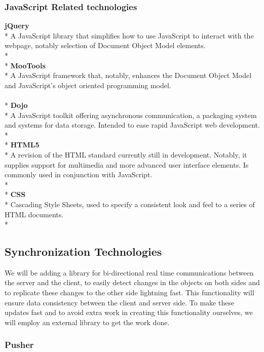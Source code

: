 \subsubsection{JavaScript Related technologies}

\textbf{jQuery}\\*
A JavaScript library that simplifies how to use JavaScript to interact with the webpage, notably selection of Document Object Model elements.\\*
\\*
\textbf{MooTools}\\*
A JavaScript framework that, notably, enhances the Document Object Model and JavaScript's object oriented programming model.\\
\\*
\textbf{Dojo}\\*
A JavaScript toolkit offering asynchronous communication, a packaging system and systems for data storage. Intended to ease rapid JavaScript web development.\\*
\\*
\textbf{HTML5}\\*
A revision of the HTML standard currently still in development. Notably, it supplies support for multimedia and more advanced user interface elements. Is commonly used in conjunction with JavaScript.\\*
\\*
\textbf{CSS}\\*
Cascading Style Sheets, used to specify a consistent look and feel to a series of HTML documents.\\*


\subsection{Synchronization Technologies}
We will be adding a library for bi-directional real time communications between the server and the client, to easily detect changes in the objects on both sides and to replicate these changes to the other side lightning fast. This functionality will ensure data consistency between the client and server side. To make these updates fast and to avoid extra work in creating this functionality ourselves, we will employ an external library to get the work done.

\subsubsection{Pusher}

